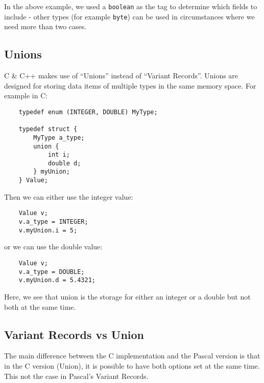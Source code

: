 In the above example, we used a \verb|boolean| as the tag to determine which fields to include - other types (for example \verb|byte|) can be used in circumstances where we need more than two cases.

\subsection{Unions}
C \& C++ makes use of ``Unions'' instead of ``Variant Records''. Unions are designed for storing data items of multiple types in the same memory space. For example in C:
\begin{verbatim}
    typedef enum (INTEGER, DOUBLE) MyType;

    typedef struct {
        MyType a_type;
        union {
            int i;
            double d;
        } myUnion;
    } Value;
\end{verbatim}
Then we can either use the integer value:
\begin{verbatim}
    Value v;
    v.a_type = INTEGER;
    v.myUnion.i = 5;
\end{verbatim}
or we can use the double value:
\begin{verbatim}
    Value v;
    v.a_type = DOUBLE;
    v.myUnion.d = 5.4321;
\end{verbatim}

Here, we see that union is the storage for either an integer or a double but not both at the same time.

\subsection{Variant Records vs Union}
The main difference between the C implementation and the Pascal version is that in the C version (Union), it is possible to have both options set at the same time. This not the case in Pascal's Variant Records.